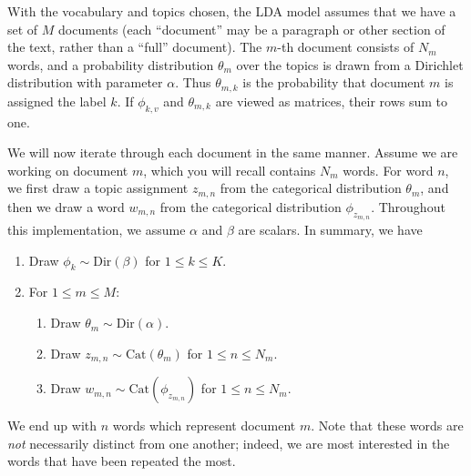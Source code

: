 With the vocabulary and topics chosen, the LDA model assumes that we have a set of $M$ documents (each ``document'' may be a paragraph or other section of the text, rather than a ``full'' document).
The $m$-th document consists of $N_m$ words, and a probability distribution $\theta_{m}$ over the topics is drawn from a Dirichlet distribution with parameter $\alpha$.
Thus $\theta_{m,k}$ is the probability that document $m$ is assigned the label $k$.
If $\phi_{k,v}$ and $\theta_{m,k}$ are viewed as matrices, their rows sum to one.

We will now iterate through each document in the same manner.
Assume we are working on document $m$, which you will recall contains $N_{m}$ words.
For word $n$, we first draw a topic assignment $z_{m,n}$ from the categorical distribution $\theta_{m}$, and then we draw a word $w_{m,n}$ from the categorical distribution $\phi_{z_{m,n}}$. Throughout this implementation, we assume $\alpha$ and $\beta$ are scalars. In summary, we have
\begin{enumerate}
    \item Draw $\phi_{k} \sim \text{Dir}(\beta)$ for $1 \leq k \leq K$.
    \item For $1 \leq m \leq M$:
    \begin{enumerate}
        \item Draw $\theta_{m} \sim \text{Dir}(\alpha)$.
        \item Draw $z_{m,n} \sim \text{Cat}(\theta_{m})$ for $1 \leq n \leq N_{m}$.
        \item Draw $w_{m,n} \sim \text{Cat}(\phi_{z_{m,n}})$ for $1 \leq n \leq N_{m}$.
    \end{enumerate}
\end{enumerate}

We end up with $n$ words which represent document $m$.
Note that these words are \emph{not} necessarily distinct from one another; indeed, we are most interested in the words that have been repeated the most.

